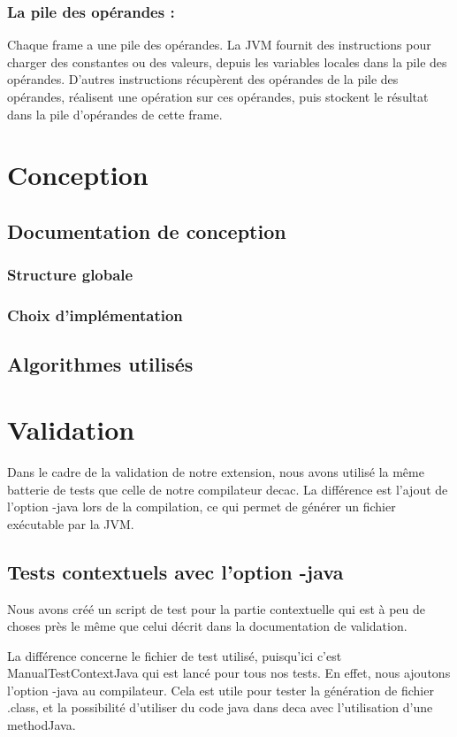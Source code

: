 \documentclass[12pt, a4paper, one side]{article}
\begin{document}
    \subsubsection{La pile des opérandes :} Chaque frame a une pile des opérandes. La JVM fournit des instructions pour charger des constantes ou des valeurs, depuis les variables locales dans la pile des opérandes. D'autres instructions récupèrent des opérandes de la pile des opérandes, réalisent une opération sur ces opérandes, puis stockent le résultat dans la pile d'opérandes de cette frame.

    \section{Conception}
    \subsection{Documentation de conception}
    \subsubsection{Structure globale}
    \subsubsection{Choix d'implémentation}
    \subsection{Algorithmes utilisés}

    \section{Validation}
    Dans le cadre de la validation de notre extension, nous avons utilisé la même batterie de tests que celle de notre compilateur decac. La différence est l'ajout de l'option -java lors de la compilation, ce qui permet de générer un fichier exécutable par la JVM.

    \subsection{Tests contextuels avec l'option -java}
    Nous avons créé un script de test pour la partie contextuelle qui est à peu de choses près le même que celui décrit dans la documentation de validation.
    \begin{flushleft}
        La différence concerne le fichier de test utilisé, puisqu'ici c'est ManualTestContextJava qui est lancé pour tous nos tests. En effet, nous ajoutons l'option -java au compilateur. Cela est utile pour tester la génération de fichier .class, et la possibilité d'utiliser du code java dans deca avec l'utilisation d'une methodJava.
    \end{flushleft}
\end{document}
